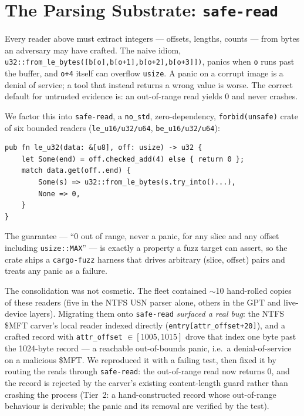 \documentclass[10pt,twocolumn]{article}
\begin{document}
\section{The Parsing Substrate: \texttt{safe-read}}\label{sec:saferead}

Every reader above must extract integers --- offsets, lengths, counts --- from
bytes an adversary may have crafted. The naive idiom, \lstinline|u32::from_le_bytes([b[o],b[o+1],b[o+2],b[o+3]])|,
panics when \texttt{o} runs past the buffer, and \lstinline|o+4| itself can
overflow \texttt{usize}. A panic on a corrupt image is a denial of service; a
tool that instead returns a wrong value is worse. The correct default for
untrusted evidence is: an out-of-range read yields $0$ and never crashes.

We factor this into \texttt{safe-read}, a \texttt{no\_std}, zero-dependency,
\texttt{forbid(unsafe)} crate of six bounded readers
(\texttt{le\_u16/u32/u64}, \texttt{be\_u16/u32/u64}):
\begin{lstlisting}
pub fn le_u32(data: &[u8], off: usize) -> u32 {
    let Some(end) = off.checked_add(4) else { return 0 };
    match data.get(off..end) {
        Some(s) => u32::from_le_bytes(s.try_into()...),
        None => 0,
    }
}
\end{lstlisting}
The guarantee --- ``$0$ out of range, never a panic, for any slice and any
offset including \texttt{usize::MAX}'' --- is exactly a property a fuzz target can
assert, so the crate ships a \texttt{cargo-fuzz} harness that drives arbitrary
(slice, offset) pairs and treats any panic as a failure.

The consolidation was not cosmetic. The fleet contained $\sim$10 hand-rolled
copies of these readers (five in the NTFS USN parser alone, others in the GPT and
live-device layers). Migrating them onto \texttt{safe-read} \emph{surfaced a real
bug}: the NTFS \$MFT carver's local reader indexed directly
(\lstinline|entry[attr_offset+20]|), and a crafted record with
\texttt{attr\_offset} $\in [1005,1015]$ drove that index one byte past the
1024-byte record --- a reachable out-of-bounds panic, i.e.\ a denial-of-service
on a malicious \$MFT. We reproduced it with a failing test, then fixed it by
routing the reads through \texttt{safe-read}: the out-of-range read now returns
$0$, and the record is rejected by the carver's existing content-length guard
rather than crashing the process (Tier~2: a hand-constructed record whose
out-of-range behaviour is derivable; the panic and its removal are verified by
the test).
\end{document}
